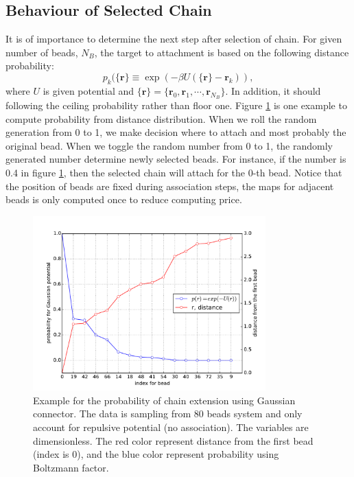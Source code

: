 \documentclass[10pt, a4paper]{report}
\begin{document}
\subsection{Behaviour of Selected Chain}
It is of importance to determine the next step after selection of chain. For given number of beads, $N_B$, the target to attachment is based on the following distance probability:
\begin{equation}
  p_k(\{\mathbf{r}\}\equiv \exp\left(-\beta U(\{\mathbf{r}\} - \mathbf{r}_k)\right),
\end{equation}
where $U$ is given potential and $\{\mathbf{r}\} = \{\mathbf{r}_0, \mathbf{r}_1, \cdots, \mathbf{r}_{N_B}\}$.
In addition, it should following the ceiling probability rather than floor one. 
Figure \ref{fig:probability_80} is one example to compute probability from distance distribution. When we roll the random generation from 0 to 1, we make decision where to attach and most probably the original bead.
When we toggle the random number from 0 to 1, the randomly generated number determine newly selected beads. For instance, if the number is 0.4 in figure \ref{fig:probability_80}, then the selected chain will attach for the 0-th bead. Notice that the position of beads are fixed during association steps, the maps for adjacent beads is only computed once to reduce computing price. 
\begin{figure}
  \centering
  \includegraphics[width=0.8\textwidth]{figures/80_potential_dist.pdf}
  \caption{Example for the probability of chain extension using Gaussian connector. The data is sampling from 80 beads system and only account for repulsive potential (no association). The variables are dimensionless. The red color represent distance from the first bead (index is 0), and the blue color represent probability using Boltzmann factor. }\label{fig:probability_80}
\end{figure}
\end{document}
